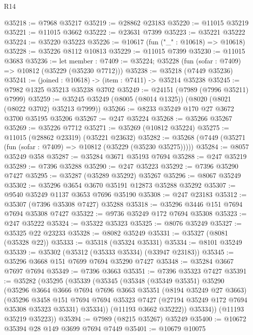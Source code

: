 \begin{lexlean}{R14}
\begin{coremodule}
@35218 := @7968 @35217
@35219 := @28862 @23183
@35220 := @11015 @35219
@35221 := @11015 @3662
@35222 := @23631 @7399
@35223 := @35221 @35222
@35224 := @35220 @35223
@35226 := @10617 (fun ("_" : @10618) => @10618)
@35228 := @35226 @8112 @10813
@35229 := @11015 @7399
@35230 := @11015 @3683
@35236 := let member : @7409 := @35224;
  @35228 (fun (sofar : @7409) => @10812 (@35229 (@35230 @7712)))
@35238 := @35218 (@7449 @35236)
@35241 := (joined : @10618) -> (item : @7411) -> @35214 @35238
@35245 := @7982 @1325 @35213 @35238 @3702
@35249 := @24151 (@7989 (@7996 @35211) @7999)
@35259 := @35245 @35249 (@8005 (@8014 @1325)) (@8020 (@8021 (@8022 @3702) @35213 @7999))
@35266 := @8233 @35249 @170 @27 @3672 @3700 @35195 @35206
@35267 := @247 @35224
@35268 := @35266 @35267
@35269 := @35226 @7712
@35271 := @35269 (@10812 @35224)
@35275 := @11015 (@28862 @23319) (@35221 @23632)
@35282 := @35268 (@7449 (@35271 (fun (sofar : @7409) => @10812 (@35229 (@35230 @35275)))))
@35284 := @8057 @35249 @358
@35287 := @35284 @3671 @35193 @7694
@35288 := @247 @35219
@35289 := @7396 @35288
@35290 := @247 @35223
@35292 := @7396 @35290 @7427
@35295 := @35287 (@35289 @35292) @35267
@35296 := @8067 @35249
@35302 := @35296 @3654 @3670 @35191 @12873 @35288 @35292
@35307 := @9540 @35249 @1137 @3653 @7696 @35190
@35308 := @247 @23183
@35312 := @35307 (@7396 @35308 @7427) @35288
@35318 := @35296 @3446 @151 @7694 @7694 @35308 @7427
@35322 := @9736 @35249 @172 @7694 @35308
@35323 := @247 @35222
@35324 := @35322 @35323
@35325 := @8076 @35249
@35327 := @35325 @22 @23233
@35328 := @8082 @35249
@35331 := @35327 (@8081 (@35328 @22))
@35333 := @35318 (@35324 @35331)
@35334 := @8101 @35249
@35339 := @35302 (@35312 (@35333 @35334) (@33947 @23183))
@35345 := @35296 @3668 @151 @7699 @7694 @35290 @7427
@35348 := @35284 @3667 @7697 @7694
@35349 := @7396 @3663
@35351 := @7396 @35323 @7427
@35391 := @35282
    (@35295
      (@35339
        (@35345
          (@35348
            (@35349 @35351)
            @35290
            (@35296
              @3664
              @3666
              @7694
              @7696
              @3663
              @35351
              (@8194 @35249 @27 @3663)
              (@35296
                @3458
                @151
                @7694
                @7694
                @35323
                @7427
                (@27194 @35249 @172 @7694 @35308 @35323 @35331)
                @35334))
            (@11193 @3662 @35222))
          @35334))
      (@11193 @35219 @35223))
@35394 := @7989 (@8215 @35267) @35249
@35400 := @10672 @35394 @28 @149 @3699 @7694 @7449
@35401 := @10679 @10075

\end{coremodule}
\end{lexlean}

